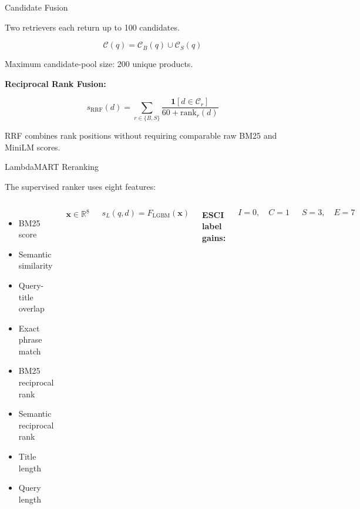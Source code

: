 \documentclass[aspectratio=169,11pt]{beamer}
\begin{document}
\begin{frame}{Candidate Fusion}

Two retrievers each return
up to 100 candidates.

\[
\mathcal{C}(q)=
\mathcal{C}_{B}(q)
\cup
\mathcal{C}_{S}(q)
\]

Maximum candidate-pool size:
200 unique products.

\vspace{0.4cm}

\textbf{Reciprocal Rank Fusion:}

\[
s_{\mathrm{RRF}}(d)=
\sum_{r\in\{B,S\}}
\frac{
\mathbf{1}[d\in\mathcal{C}_r]
}{
60+\mathrm{rank}_r(d)
}
\]

\vspace{0.2cm}

RRF combines rank positions
without requiring comparable
raw BM25 and MiniLM scores.

\end{frame}

\begin{frame}{LambdaMART Reranking}

The supervised ranker uses
eight features:

\begin{columns}


\begin{itemize}
\item BM25 score
\item Semantic similarity
\item Query-title overlap
\item Exact phrase match
\item BM25 reciprocal rank
\item Semantic reciprocal rank
\item Title length
\item Query length
\end{itemize}


\[
\mathbf{x}\in\mathbb{R}^{8}
\]

\[
s_L(q,d)=
F_{\mathrm{LGBM}}(\mathbf{x})
\]

\vspace{0.25cm}

\textbf{ESCI label gains:}

\[
I=0,\quad C=1
\]

\[
S=3,\quad E=7
\]

\end{columns}

\end{frame}
\end{document}
